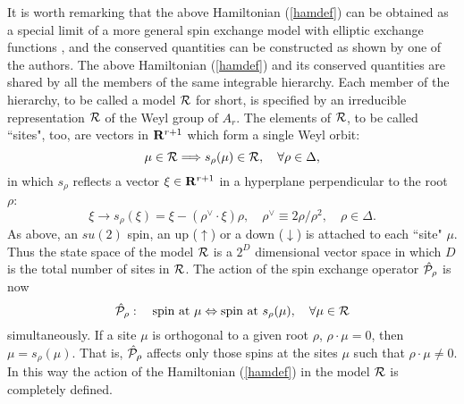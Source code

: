 \documentclass[a4paper,12pt]{article}
\begin{document}
It is worth remarking that the above Hamiltonian (\ref{hamdef})
can be obtained as
a special limit of a more general spin exchange model with elliptic exchange
functions \cite{ino1}, and the conserved quantities can be constructed
\cite{ino2}
as shown by one of the authors. The above Hamiltonian (\ref{hamdef}) and its
conserved quantities are shared by all the members of the same integrable
hierarchy.
Each member of the hierarchy,  to be called a model ${\cal R}$ for short, is
specified by an irreducible representation ${\cal R}$ of the Weyl group of
$A_r$.
The elements of ${\cal R}$, to be called ``sites", too, are vectors in
${\bf R}^{r+1}$ which form a single Weyl orbit:
\begin{equation}
\mu\in{\cal R}\Longrightarrow s_{\rho}(\mu)\in{\cal R},\quad
 \forall\rho\in\Delta,
\end{equation}
in which $s_\rho$ reflects
a vector $\xi\in{\bf R}^{r+1}$ in a hyperplane perpendicular to the root
$\rho$:
\begin{equation}
\xi\to s_\rho(\xi)=\xi-(\rho^\vee\!\cdot\xi)\rho,\quad
\rho^\vee\equiv 2\rho/\rho^2,\quad \rho\in\Delta.
\end{equation}
As above, an $su(2)$ spin, an up ($\uparrow$)
or a down ($\downarrow$) is attached
to each ``site" $\mu$. Thus the state space of the
model ${\cal R}$ is a $2^{D}$
dimensional vector space in which $D$ is the total
number of sites in ${\cal R}$.
The action of the spin exchange operator
$\hat{\cal P}_\rho$ is now
\begin{equation}
\hat{\cal P}_\rho:\quad \mbox{spin at}\ \mu\Leftrightarrow
\mbox{spin at}\ s_\rho(\mu),\quad \forall\mu\in{\cal R}
\end{equation}
simultaneously. If a site $\mu$ is orthogonal to a given root $\rho$,
$\rho\cdot\mu=0$, then $\mu=s_\rho(\mu)$.
That is, $\hat{\cal P}_\rho$ affects only those spins at
the sites $\mu$ such that
$\rho\cdot\mu\neq0$.
In this way the action of the Hamiltonian (\ref{hamdef}) in
the model
${\cal R}$ is completely defined.
\end{document}
